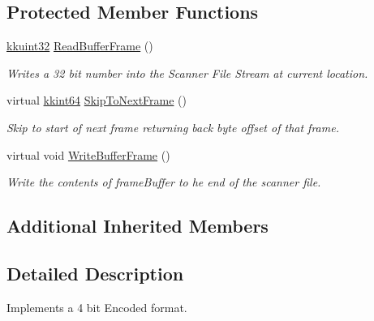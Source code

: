 \subsection*{Protected Member Functions}
\begin{DoxyCompactItemize}
\item 
\hyperlink{namespace_k_k_b_af8d832f05c54994a1cce25bd5743e19a}{kkuint32} \hyperlink{class_k_k_l_s_c_1_1_scanner_file4_bit_encoded_a4acb42abe526d299d1f699b2a5b47cb5}{Read\+Buffer\+Frame} ()
\begin{DoxyCompactList}\small\item\em Writes a 32 bit number into the Scanner File Stream at current location. \end{DoxyCompactList}\item 
virtual \hyperlink{namespace_k_k_b_aa3486b1c5ea9162b3b020c69f72826eb}{kkint64} \hyperlink{class_k_k_l_s_c_1_1_scanner_file4_bit_encoded_a3c2c9efe1dffb51ad6d5a83fae21b8ae}{Skip\+To\+Next\+Frame} ()
\begin{DoxyCompactList}\small\item\em Skip to start of next frame returning back byte offset of that frame. \end{DoxyCompactList}\item 
virtual void \hyperlink{class_k_k_l_s_c_1_1_scanner_file4_bit_encoded_a73a2ef0c4319abfc8d8ca538662fa927}{Write\+Buffer\+Frame} ()
\begin{DoxyCompactList}\small\item\em Write the contents of \textquotesingle{}frame\+Buffer\textquotesingle{} to he end of the scanner file. \end{DoxyCompactList}\end{DoxyCompactItemize}
\subsection*{Additional Inherited Members}


\subsection{Detailed Description}
Implements a 4 bit Encoded format. 


